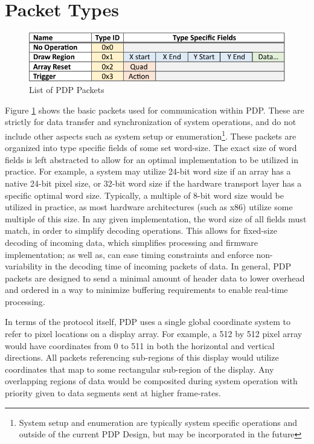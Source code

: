 \section{Packet Types}

\begin{figure}
    \centering
    \includegraphics[width=1.0\textwidth]{fig/packet_chart.pdf}
    \caption{List of PDP Packets}
    \label{fig:packets}
\end{figure}

Figure \ref{fig:packets} shows the basic packets used for communication within PDP. These are strictly for data transfer and synchronization of system operations, and do not include other aspects such as system setup or enumeration\footnote{System setup and enumeration are typically system specific operations and outside of the current PDP Design, but may be incorporated in the future}. These packets are organized into type specific fields of some set word-size. The exact size of word fields is left abstracted to allow for an optimal implementation to be utilized in practice. For example, a system may utilize 24-bit word size if an array has a native 24-bit pixel size, or 32-bit word size if the hardware transport layer has a specific optimal word size. Typically, a multiple of 8-bit word size would be utilized in practice, as most hardware architectures (such as x86) utilize some multiple of this size. In any given implementation, the word size of all fields must match, in order to simplify decoding operations. This allows for fixed-size decoding of incoming data, which simplifies processing and firmware implementation; as well as, can ease timing constraints and enforce non-variability in the decoding time of incoming packets of data. In general, PDP packets are designed to send a minimal amount of header data to lower overhead and ordered in a way to minimize buffering requirements to enable real-time processing.

In terms of the protocol itself, PDP uses a single global coordinate system to refer to pixel locations on a display array. For example, a 512 by 512 pixel array would have coordinates from 0 to 511 in both the horizontal and vertical directions. All packets referencing sub-regions of this display would utilize coordinates that map to some rectangular sub-region of the display. Any overlapping regions of data would be composited during system operation with priority given to data segments sent at higher frame-rates.

